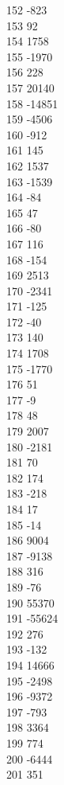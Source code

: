 { 152	-823 \\
 153	92 \\
 154	1758 \\
 155	-1970 \\
 156	228 \\
 157	20140 \\
 158	-14851 \\
 159	-4506 \\
 160	-912 \\
 161	145 \\
 162	1537 \\
 163	-1539 \\
 164	-84 \\
 165	47 \\
 166	-80 \\
 167	116 \\
 168	-154 \\
 169	2513 \\
 170	-2341 \\
 171	-125 \\
 172	-40 \\
 173	140 \\
 174	1708 \\
 175	-1770 \\
 176	51 \\
 177	-9 \\
 178	48 \\
 179	2007 \\
 180	-2181 \\
 181	70 \\
 182	174 \\
 183	-218 \\
 184	17 \\
 185	-14 \\
 186	9004 \\
 187	-9138 \\
 188	316 \\
 189	-76 \\
 190	55370 \\
 191	-55624 \\
 192	276 \\
 193	-132 \\
 194	14666 \\
 195	-2498 \\
 196	-9372 \\
 197	-793 \\
 198	3364 \\
 199	774 \\
 200	-6444 \\
 201	351 \\
}
